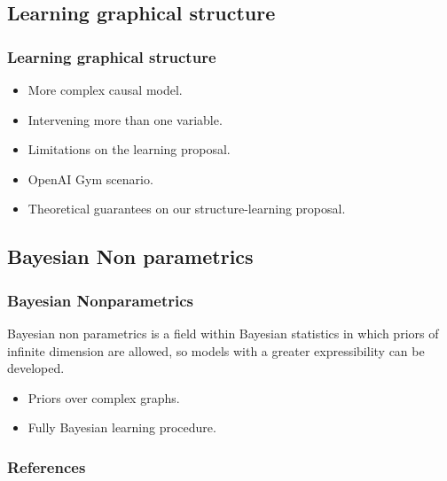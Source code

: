 \documentclass{beamer}
\theoremstyle{plain}
\begin{document}
\subsection{Learning graphical structure}
\begin{frame}
\frametitle{Learning graphical structure}
\begin{itemize}
\item More complex causal model.
\item Intervening more than one variable.
\item Limitations on the learning proposal.
\item OpenAI Gym scenario.
\item Theoretical guarantees on our structure-learning proposal.
\end{itemize} 
\end{frame}

\subsection{Bayesian Non parametrics}
\begin{frame}
\frametitle{Bayesian Nonparametrics}
Bayesian non parametrics is a field within Bayesian statistics in which priors of infinite dimension are allowed, so models with a greater expressibility can be developed.
\begin{itemize}
\item Priors over complex graphs.
\item Fully Bayesian learning procedure.
\end{itemize}
\end{frame}

\begin{frame}[allowframebreaks]
\frametitle{References}


\end{frame}
\end{document}
